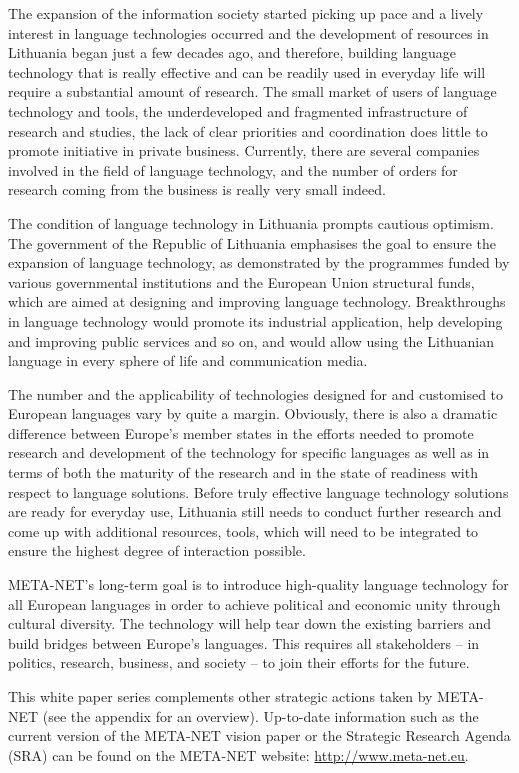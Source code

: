 \begin{multicols}{2}

The expansion of the information society started picking up pace and a lively interest in language technologies occurred and the development of resources in Lithuania began just a few decades ago, and therefore, building language technology that is really effective and can be readily used in everyday life will require a substantial amount of research. The small market of users of language technology and tools, the underdeveloped and fragmented infrastructure of research and studies, the lack of clear priorities and coordination does little to promote initiative in private business. Currently, there are several companies involved in the field of language technology, and the number of orders for research coming from the business is really very small indeed.

The condition of language technology in Lithuania prompts cautious optimism. The government of the Republic of Lithuania emphasises the goal to ensure the expansion of language technology, as demonstrated by the programmes funded by various governmental institutions and the European Union structural funds, which are aimed at designing and improving language technology. Breakthroughs in language technology would promote its industrial application, help developing and improving public services and so on, and would allow using the Lithuanian language in every sphere of life and communication media.

The number and the applicability of technologies designed for and customised to European languages vary by quite a margin. Obviously, there is also a dramatic difference between Europe’s member states in the efforts needed to promote research and development of the technology for specific languages as well as in terms of both the maturity of the research and in the state of readiness with respect to language solutions. Before truly effective language technology solutions are ready for everyday use, Lithuania still needs to conduct further research and come up with additional resources, tools, which will need to be integrated to ensure the highest degree of interaction possible.

META-NET’s long-term goal is to introduce high-quality language technology for all European languages in order to achieve political and economic unity through cultural diversity. The technology will help tear down the existing barriers and build bridges between Europe’s languages. This requires all stakeholders – in politics, research, business, and society – to join their efforts for the future.

This white paper series complements other strategic actions taken by META-NET (see the appendix for an overview). Up-to-date information such as the current version of the META-NET vision paper or the Strategic Research Agenda (SRA) can be found on the META-NET website: \url{http://www.meta-net.eu}.  \end{multicols}

